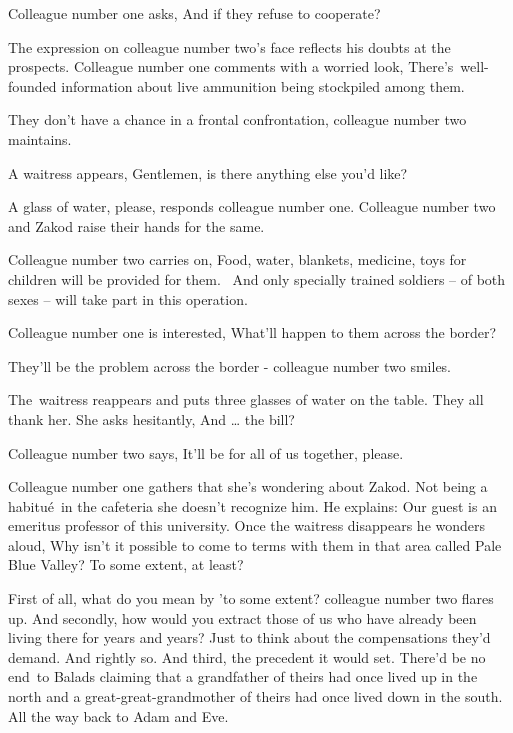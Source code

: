 \documentclass[letterpaper]{article}
\begin{document}
Colleague number one asks, {\textquotedbl}And if they refuse to cooperate?{\textquotedbl} 

The expression on colleague number two's face reflects his doubts at the prospects. Colleague number one comments with a
worried look, {\textquotedbl}There's\ well-founded information about live ammunition being stockpiled among
them.{\textquotedbl}~ 

{\textquotedbl}They don't have a chance in a frontal confrontation,{\textquotedbl} colleague number two maintains.

A waitress appears, {\textquotedbl}Gentlemen, is there anything else you'd like?{\textquotedbl} 

{\textquotedbl}A glass of water, please,{\textquotedbl} responds colleague number one. Colleague number two and Zakod
raise their hands for the same. 

Colleague number two carries on, {\textquotedbl}Food, water, blankets, medicine, toys for children will be provided for
them. ~And only specially trained soldiers -- of both sexes -- will take part in this operation.{\textquotedbl} 

Colleague number one is interested, {\textquotedbl}What{}'ll happen to them across the border?{\textquotedbl} 

{\textquotedbl}They'll be the problem across the border -{\textquotedbl} colleague number two smiles.

The~waitress reappears and puts three glasses of water on the table. They all thank her. She asks hesitantly,
{\textquotedbl}And {\dots} the bill?{\textquotedbl} 

Colleague number two says, {\textquotedbl}It'll be for all of us together, please.{\textquotedbl} 

Colleague number one gathers that she's wondering about Zakod. Not being a habitu\'e\ in the cafeteria she doesn't
recognize him. He explains: {\textquotedbl}Our guest is an emeritus professor of this university.{\textquotedbl} Once
the waitress disappears he wonders aloud, {\textquotedbl}Why isn't it possible to come to terms with them in that area
called Pale Blue Valley? To some extent, at least?{\textquotedbl} \ 

{\textquotedbl}First of all, what do you mean by 'to some extent?{\textquotedbl} colleague number two flares up.
{\textquotedbl}And secondly, how would you extract those of us who have already been living there for years and years?
Just to think about the compensations they'd demand. And rightly so. And third, the precedent it would set. There'd be
no end\ to Balads claiming that a grandfather of theirs had once lived up in the north and a great-great-grandmother of
theirs had once lived down in the south. All the way back to Adam and Eve.{\textquotedbl} 
\end{document}
